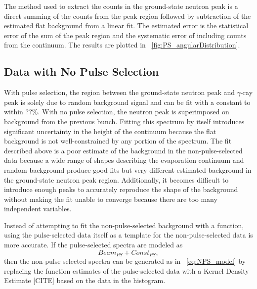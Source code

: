 The method used to extract the counts in the ground-state neutron peak is a direct summing of the counts from the peak region followed by subtraction of the estimated flat background from a linear fit.  The estimated error is the statistical error of the sum of the peak region and the systematic error of including counts from the continuum.  The results are plotted in {\fig}~\ref{fig:PS_angularDistribution}.


\subsection{Data with No Pulse Selection}
With pulse selection, the region between the ground-state neutron peak and $\gamma$-ray peak is solely due to random background signal and can be fit with a constant to within ??\%.  With no pulse selection, the neutron peak is superimposed on background from the previous bunch.  Fitting this spectrum by itself introduces significant uncertainty in the height of the continuum because the flat background is not well-constrained by any portion of the spectrum.  The fit described above is a poor estimate of the background in the non-pulse-selected data because a wide range of shapes describing the evaporation continuum and random background produce good fits but very different estimated background in the ground-state neutron peak region.  Additionally, it becomes difficult to introduce enough peaks to accurately reproduce the shape of the background without making the fit unable to converge because there are too many independent variables. 

Instead of attempting to fit the non-pulse-selected background with a function, using the pulse-selected data itself as a template for the non-pulse-selected data is more accurate.  If the pulse-selected spectra are modeled as
\begin{equation}
Beam_{PS} + Const_{PS},
\end{equation}
then the non-pulse selected spectra can be generated as in {\eqn}~\ref{eq:NPS_model} by replacing the function estimates of the pulse-selected data with a Kernel Density Estimate [CITE] based on the data in the histogram.  

